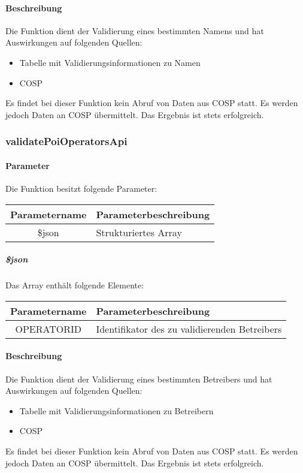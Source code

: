 \paragraph{Beschreibung} Die Funktion dient der Validierung eines bestimmten Namens und hat Auswirkungen auf folgenden Quellen:
\begin{itemize}
	\item Tabelle mit Validierungsinformationen zu Namen
	\item COSP
\end{itemize}
Es findet bei dieser Funktion kein Abruf von Daten aus {\glqq COSP\grqq} statt. Es werden jedoch Daten an {\glqq COSP\grqq} übermittelt. Das Ergebnis ist stets erfolgreich.
\subsubsection{validatePoiOperatorsApi}
\paragraph{Parameter} Die Funktion besitzt folgende Parameter:
\begin{table}[H]
	\begin{tabular}{|c|p{11cm}|}
		\hline
		\textbf{Parametername} & \textbf{Parameterbeschreibung} \\ \hline
		\$json & Strukturiertes Array \\ \hline
	\end{tabular}
\end{table}
\subparagraph{\$json}Das Array enthält folgende Elemente:
\begin{table}[H]
	\begin{tabular}{|c|p{11cm}|}
		\hline
		\textbf{Parametername} & \textbf{Parameterbeschreibung} \\ \hline
		OPERATORID & Identifikator des zu validierenden Betreibers \\ \hline
	\end{tabular}
\end{table}
\paragraph{Beschreibung} Die Funktion dient der Validierung eines bestimmten Betreibers und hat Auswirkungen auf folgenden Quellen:
\begin{itemize}
	\item Tabelle mit Validierungsinformationen zu Betreibern
	\item COSP
\end{itemize}
Es findet bei dieser Funktion kein Abruf von Daten aus {\glqq COSP\grqq} statt. Es werden jedoch Daten an {\glqq COSP\grqq} übermittelt. Das Ergebnis ist stets erfolgreich.
